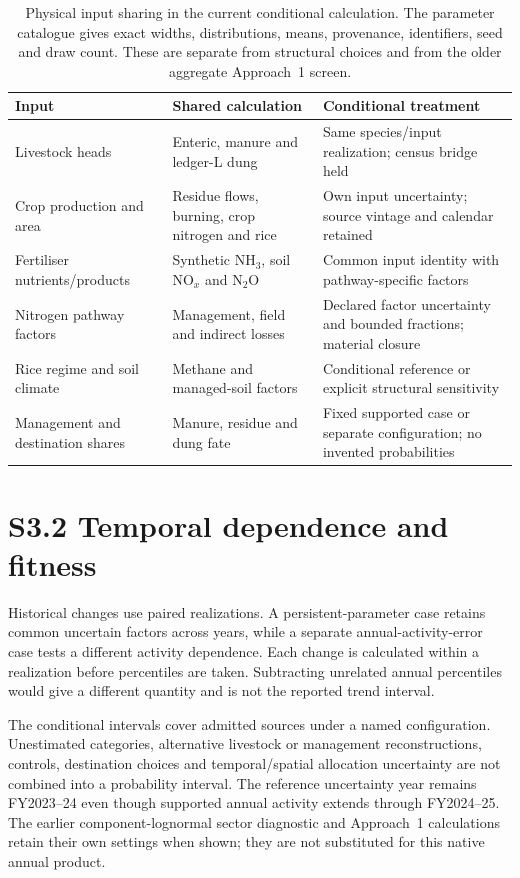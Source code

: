 \begin{table}[!htbp]\centering\footnotesize
\begin{tabular}{@{}p{.28\linewidth}p{.29\linewidth}p{.33\linewidth}@{}}
\toprule
Input & Shared calculation & Conditional treatment\\\midrule
Livestock heads & Enteric, manure and ledger-L dung & Same species/input realization; census bridge held\\
Crop production and area & Residue flows, burning, crop nitrogen and rice & Own input uncertainty; source vintage and calendar retained\\
Fertiliser nutrients/products & Synthetic NH$_3$, soil NO$_x$ and N$_2$O & Common input identity with pathway-specific factors\\
Nitrogen pathway factors & Management, field and indirect losses & Declared factor uncertainty and bounded fractions; material closure\\
Rice regime and soil climate & Methane and managed-soil factors & Conditional reference or explicit structural sensitivity\\
Management and destination shares & Manure, residue and dung fate & Fixed supported case or separate configuration; no invented probabilities\\\bottomrule
\end{tabular}
\caption{Physical input sharing in the current conditional calculation. The
parameter catalogue gives exact widths, distributions, means, provenance,
identifiers, seed and draw count. These are separate from structural choices and
from the older aggregate Approach~1 screen.}\label{tab:s3}
\end{table}

\section*{S3.2 Temporal dependence and fitness}

Historical changes use paired realizations. A persistent-parameter case retains
common uncertain factors across years, while a separate annual-activity-error
case tests a different activity dependence. Each change is calculated within a
realization before percentiles are taken. Subtracting unrelated annual percentiles
would give a different quantity and is not the reported trend interval.

The conditional intervals cover admitted sources under a named configuration.
Unestimated categories, alternative livestock or management reconstructions,
controls, destination choices and temporal/spatial allocation uncertainty are not
combined into a probability interval. The reference uncertainty year remains
FY2023--24 even though supported annual activity extends through FY2024--25.
The earlier component-lognormal sector diagnostic and Approach~1 calculations
retain their own settings when shown; they are not substituted for this native
annual product.
